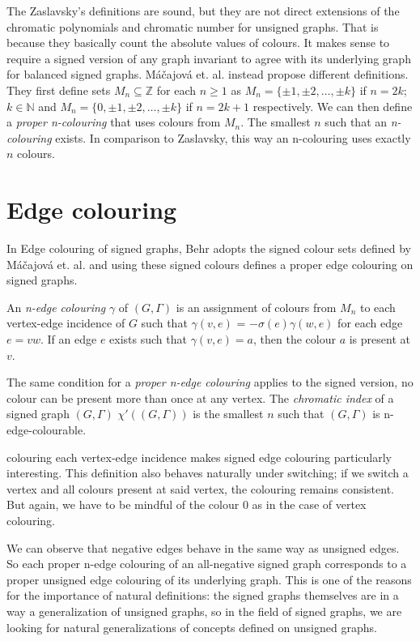 The Zaslavsky's definitions are sound, but they are not direct extensions of the chromatic polynomials and chromatic number for
unsigned graphs. That is because they basically count the absolute values of colours. It makes sense to require a signed version of any graph invariant to agree with its underlying graph for balanced signed graphs.
Máčajová et. al.\cite{chromatic-number} instead propose different definitions.
They first define sets $M_n \subseteq \mathbb{Z}$ for each $n \geq 1$ as $M_n = \{\pm 1, \pm 2, \dots , \pm k\}$ if $n = 2k$; $k \in \mathbb{N}$
and $M_n = \{0, \pm 1, \pm 2, \dots , \pm k\}$ if $n = 2k + 1$ respectively.
We can then define a \textit{proper n-colouring} that uses colours from $M_n$. The smallest $n$ such that
an \textit{n-colouring} exists. In comparison to Zaslavsky, this way an n-colouring uses exactly $n$ colours.

\section{Edge colouring}

In Edge colouring of signed graphs\cite{behr-edge-colouring}, Behr adopts the signed colour sets defined by Máčajová et. al. and using these signed colours
defines a proper edge colouring on signed graphs.

An \textit{n-edge colouring} $\gamma$ of $(G, \Gamma)$ is an assignment of colours from $M_n$ to each vertex-edge incidence of $G$ such that $\gamma (v, e)$ = $- \sigma (e) \gamma(w,e)$ for each edge $e = vw$.
If an edge $e$ exists such that $\gamma (v,e) = a$, then the colour $a$ is present at $v$.

The same condition for a \textit{proper n-edge colouring} applies to the signed version, no colour can be present more than once at any vertex.
The \textit{chromatic index} of a signed graph $(G, \Gamma)$ $\chi ' ((G, \Gamma))$ is the smallest $n$ such that $(G, \Gamma)$ is n-edge-colourable.

colouring each vertex-edge incidence makes signed edge colouring particularly interesting.
This definition also behaves naturally under switching; if we switch a vertex and all colours present at said vertex, the colouring remains consistent.
But again, we have to be mindful of the colour $0$ as in the case of vertex colouring.

We can observe that negative edges behave in the same way as unsigned edges.
So each proper n-edge colouring of an all-negative signed graph corresponds to a proper unsigned edge colouring of its underlying graph.
This is one of the reasons for the importance of natural definitions: the signed graphs themselves are in a way a generalization of unsigned graphs, so in the field of signed graphs, we are looking for natural generalizations
of concepts defined on unsigned graphs.
